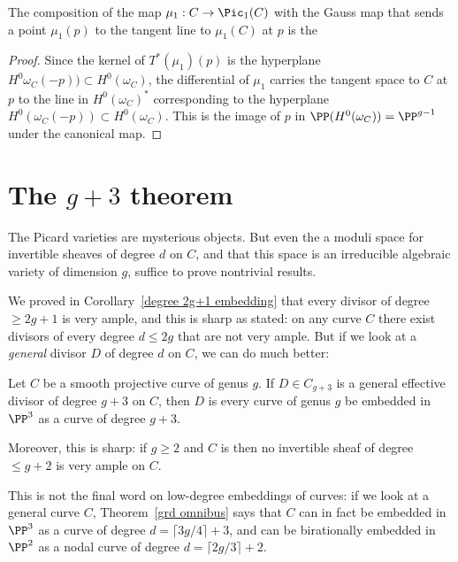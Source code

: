 \begin{corollary}
The composition of the map $\mu_{1}: C \to \Pic_{1}(C)$ with the 
Gauss map 
%
that sends a point $\mu_{1}(p)$
to the tangent line to $\mu_{1}(C)$ at $p$ is the 
%
\unif
\end{corollary}

\begin{proof}
Since 
the kernel of $T^*(\mu_1)(p)$ is  the hyperplane $H^{0}\omega_{C}(-p))\subset H^{0}(\omega_{C})$, the differential 
of $\mu_{1}$ carries the tangent space to $C$ at $p$ to the line
in $H^0(\omega_C)^*$ corresponding to the hyperplane $H^0(\omega_C(-p))\subset H^0(\omega_C)$.
This is the image of $p$ in $\PP(H^{0}(\omega_{C})) = \PP^{g-1}$ under the
canonical map.
\end{proof}


\section{The $g+3$ theorem}\label{g+3 section}

The Picard varieties are mysterious objects.  But even the 
a  moduli space for invertible sheaves of degree $d$ on $C$, and 
that this space is an irreducible algebraic variety of dimension $g$,
suffice to prove nontrivial results. 

We proved in Corollary~\ref{degree 2g+1 embedding} that every divisor
of degree $\geq 2g+1$ is very ample, and this is sharp as stated: on
any curve $C$ there exist divisors of every degree $d \leq 2g$ that
are not very ample. But if we look at a \emph{general} divisor $D$ of
degree $d$ on  $C$, we can do much better: 

\begin{theorem}[$g+3$ theorem]\label{g+3 theorem}
Let $C$ be a smooth projective curve of genus $g$. If $D \in C_{g+3}$
is a general effective divisor of degree $g+3$ on $C$, then $D$ is 
%
%
every curve of genus $g$ 
be embedded in $\PP^3$ as a curve of degree $g+3$.

Moreover, this is sharp: if $g\geq 2$ and $C$ is 
%
then no invertible sheaf of degree $\leq g+2$ is very ample on $C$.
\end{theorem}

This is not the final word on low-degree embeddings of curves: if we look at a general curve $C$, Theorem~\ref{grd omnibus} says that $C$ can in fact be embedded in $\PP^{3}$ as a curve of degree $d = \lceil 3g/4 \rceil + 3$, and can be birationally embedded in $\PP^2$ as a nodal curve of degree $d = \lceil 2g/3 \rceil + 2$.


